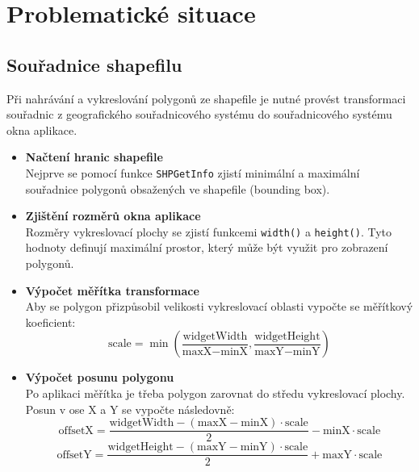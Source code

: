 \section{Problematické situace}

\subsection{Souřadnice shapefilu}
Při nahrávání a vykreslování polygonů ze shapefile je nutné provést transformaci souřadnic z geografického souřadnicového systému do souřadnicového systému okna aplikace.

\begin{itemize}
    \item \textbf{Načtení hranic shapefile} \\
    Nejprve se pomocí funkce \texttt{SHPGetInfo} zjistí minimální a maximální souřadnice polygonů obsažených ve shapefile (bounding box).

    \item \textbf{Zjištění rozměrů okna aplikace} \\
    Rozměry vykreslovací plochy se zjistí funkcemi \texttt{width()} a \texttt{height()}. Tyto hodnoty definují maximální prostor, který může být využit pro zobrazení polygonů.

    \item \textbf{Výpočet měřítka transformace} \\
    Aby se polygon přizpůsobil velikosti vykreslovací oblasti vypočte se měřítkový koeficient:
    \begin{equation}
        \text{scale} = \min \left( \frac{\text{widgetWidth}}{\text{maxX} - \text{minX}}, \frac{\text{widgetHeight}}{\text{maxY} - \text{minY}} \right)
    \end{equation}

    \item \textbf{Výpočet posunu polygonu} \\
    Po aplikaci měřítka je třeba polygon zarovnat do středu vykreslovací plochy. Posun v ose X a Y se vypočte následovně:
    \begin{equation}
        \text{offsetX} = \frac{\text{widgetWidth} - (\text{maxX} - \text{minX}) \cdot \text{scale}}{2} - \text{minX} \cdot \text{scale}
    \end{equation}
    \begin{equation}
        \text{offsetY} = \frac{\text{widgetHeight} - (\text{maxY} - \text{minY}) \cdot \text{scale}}{2} + \text{maxY} \cdot \text{scale}
    \end{equation}


\end{itemize}
